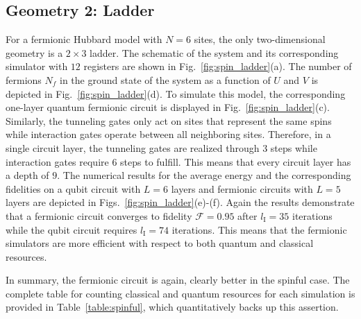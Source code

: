 \documentclass[aps, prx, reprint, superscriptaddress]{revtex4-2}
\begin{document}
\subsection{Geometry 2: Ladder}
\label{subsec:spin_ladder}
For a fermionic Hubbard model with $N{=}6$ sites, the only two-dimensional geometry is a $2{\times} 3$ ladder. The schematic of the system and its corresponding simulator with $12$ registers are shown in Fig.~\ref{fig:spin_ladder}(a). The number of fermions $N_f$ in the ground state of the system as a function of $U$ and $V$ is depicted in Fig.~\ref{fig:spin_ladder}(d).
To simulate this model, the corresponding one-layer quantum fermionic circuit is displayed in Fig.~\ref{fig:spin_ladder}(c). Similarly, the tunneling gates only act on sites that represent the same spins while interaction gates operate between all neighboring sites. Therefore, in a single circuit layer, the tunneling gates are realized through $3$ steps while interaction gates require $6$ steps to fulfill. This means that every circuit layer has a depth of $9$.  
The numerical results for the average energy and the corresponding fidelities on a qubit circuit with $L{=}6$ layers and fermionic circuits with $L{=}5$ layers are depicted in Figs.~\ref{fig:spin_ladder}(e)-(f). Again the results demonstrate that a fermionic circuit converges to fidelity $\mathcal{F}{=}0.95$ after $l_\text{I}{=}35$ iterations while the qubit circuit requires $l_\text{I}{=}74$ iterations.   This means that the fermionic simulators are more efficient with respect to both quantum and classical resources. 

\noindent In summary, the fermionic circuit is again, clearly better in the spinful case. The complete table for counting classical and quantum resources for each simulation is provided in Table~\ref{table:spinful}, which quantitatively backs up this assertion.
\end{document}
